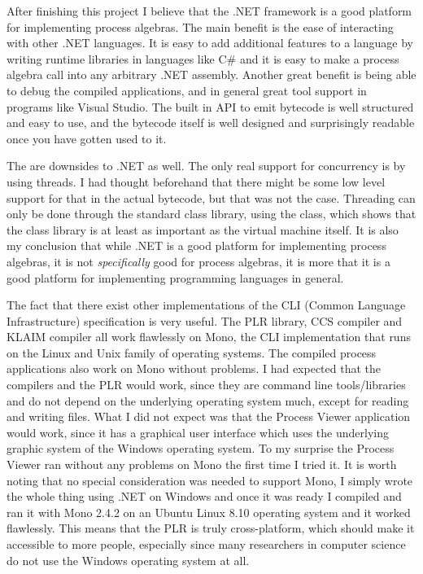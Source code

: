 	After finishing this project I believe that the .NET framework is a
	good platform for implementing process algebras. The main benefit is the 
	ease of interacting with other .NET languages. It is easy to add additional 
	features to a language by writing runtime libraries in languages like C\# 
	and it is easy to make a process algebra call into any arbitrary .NET 
	assembly. Another great benefit is being able to debug the compiled 
	applications, and in general great tool support in programs like Visual 
	Studio. The built in API to emit bytecode is well structured and easy to 
	use, and the bytecode itself is well designed and surprisingly readable once 
	you have gotten used to it. 
	
	The are downsides to .NET as well. The only real support for concurrency is 
	by using threads. I had thought beforehand that there might be some low 
	level support for that in the actual bytecode, but that was not the case. 
	Threading can only be done through the standard class library, using the 
	 class, which shows that the class library is at least as 
	important as the virtual machine itself. It is also my conclusion that while
	.NET is a good platform for implementing process algebras, it is not 
	\textit{specifically} good for process algebras, it is more that it is a 
	good platform for implementing programming languages in general. 

	The fact that there exist other implementations of the CLI (Common Language 
	Infrastructure) specification is very useful. The PLR library, CCS compiler 
	and KLAIM compiler all work flawlessly on Mono, the CLI implementation that 
	runs on the Linux and Unix family of operating systems. The compiled process 
	applications also work on Mono without problems. I had expected that the 
	compilers and the PLR would work, since they are command line tools/libraries
	and do not depend on the underlying operating system much, except for reading
	and writing files. What I did not expect was that the Process Viewer 
	application would work, since it has a graphical user interface which uses
	the underlying graphic system of the Windows operating system. To my surprise
	the Process Viewer ran without any problems on Mono the first time I tried 
	it. It is worth noting that no special consideration was needed to support 
	Mono, I simply wrote the whole thing using .NET on Windows and once it was 
	ready I compiled and ran it with Mono 2.4.2 on an Ubuntu Linux 8.10 
	operating system and it worked flawlessly. This means that the PLR is truly 
	cross-platform, which should make it accessible to more people, especially 
	since many researchers in computer science do not use the Windows operating 
	system at all. 

